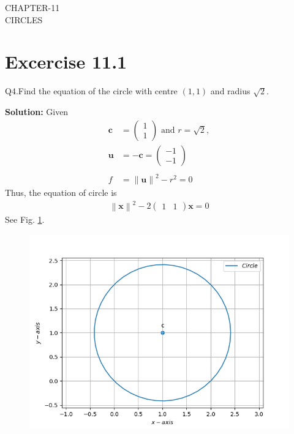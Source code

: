 \documentclass[12pt]{article}
\providecommand{\norm}[1]{\left\lVert#1\right\rVert}
\newcommand{\solution}{\noindent \textbf{Solution: }}
\newcommand{\myvec}[1]{\ensuremath{\begin{pmatrix}#1\end{pmatrix}}}
\let\vec\mathbf
\begin{document}
\begin{center}
\textbf\large{CHAPTER-11 \\ CIRCLES}

\end{center}
\section*{Excercise 11.1}

Q4.Find the equation of the circle with centre $(1,1)$ and radius $\sqrt{2}$.

\solution
\fi
Given
\begin{align}
	\vec{c} &= \myvec{1\\1} \text{ and } r = \sqrt{2},
	\\
	\vec{u}&=\vec{-c}
	 = \myvec{-1\\-1}\\
	 \\
	f &= \norm{\vec{u}}^2 - r^2
	  =0	
\end{align}
Thus, the equation of circle is 
\begin{align}
	\norm{\vec{x}}^2 -2\myvec{1&1}\vec{x} = 0       		       
\end{align}	
See Fig. 
\ref{fig:chapters/11/11/1/4/Fig1}.
\begin{figure}[!ht]
	\begin{center} 
	  \includegraphics[width=\columnwidth]{chapters/11/11/1/4/figs/circ.png}
	\end{center}
\caption{}
\label{fig:chapters/11/11/1/4/Fig1}
\end{figure}
\end{document}
